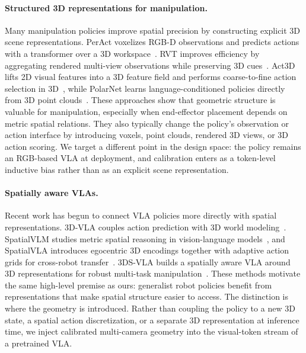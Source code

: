 \documentclass{article}
\begin{document}
\paragraph{Structured 3D representations for manipulation.}
Many manipulation policies improve spatial precision by constructing explicit 3D scene representations. PerAct voxelizes RGB-D observations and predicts actions with a transformer over a 3D workspace~\citep{shridhar2023peract}. RVT improves efficiency by aggregating rendered multi-view observations while preserving 3D cues~\citep{goyal2023rvt}. Act3D lifts 2D visual features into a 3D feature field and performs coarse-to-fine action selection in 3D~\citep{gervet2023act3d}, while PolarNet learns language-conditioned policies directly from 3D point clouds~\citep{chen2023polarnet}. These approaches show that geometric structure is valuable for manipulation, especially when end-effector placement depends on metric spatial relations. They also typically change the policy's observation or action interface by introducing voxels, point clouds, rendered 3D views, or 3D action scoring. We target a different point in the design space: the policy remains an RGB-based VLA at deployment, and calibration enters as a token-level inductive bias rather than as an explicit scene representation.

\paragraph{Spatially aware VLAs.}
Recent work has begun to connect VLA policies more directly with spatial representations. 3D-VLA couples action prediction with 3D world modeling~\citep{zhen2024threedvla}. SpatialVLM studies metric spatial reasoning in vision-language models~\citep{chen2024spatialvlm}, and SpatialVLA introduces egocentric 3D encodings together with adaptive action grids for cross-robot transfer~\citep{qu2025spatialvla}. 3DS-VLA builds a spatially aware VLA around 3D representations for robust multi-task manipulation~\citep{li2025threedsvla}. These methods motivate the same high-level premise as ours: generalist robot policies benefit from representations that make spatial structure easier to access. The distinction is where the geometry is introduced. Rather than coupling the policy to a new 3D state, a spatial action discretization, or a separate 3D representation at inference time, we inject calibrated multi-camera geometry into the visual-token stream of a pretrained VLA.
\end{document}
